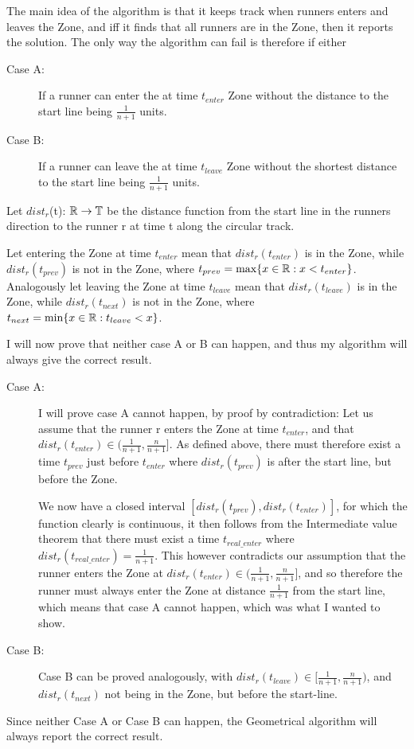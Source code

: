 \begin{theo}[Correctness:]
The main idea of the algorithm is that it keeps track when runners enters and leaves the Zone, and iff it finds that all runners are in the Zone, then it reports the solution. The only way the algorithm can fail is therefore if either

\begin{description}
\item[Case A:] If a runner can enter the at time $t_{enter}$ Zone without the distance to the start line being $\frac{1}{n+1}$ units. 
\item[Case B:] If a runner can leave the at time $t_{leave}$ Zone without the shortest distance to the start line being $\frac{1}{n+1}$ units.  
\end{description}
Let $dist_r$(t): $\mathbb{R} \rightarrow \mathbb{T}$ be the distance function from the start line in the runners direction to the runner r at time t along the circular track.

Let entering the Zone at time $t_{enter}$ mean that $dist_r(t_{enter})$ is in the Zone, while $dist_r(t_{prev})$ is not in the Zone, where $t_{prev} = \max\{x \in \mathbb{R}: x < t_{enter}\}$. Analogously let leaving the Zone at time $t_{leave}$ mean that $dist_r(t_{leave})$ is in the Zone, while $dist_r(t_{next})$ is not in the Zone, where $t_{next} = \min\{x \in \mathbb{R}: t_{leave} < x\}$.
 
I will now prove that neither case A or B can happen, and thus my algorithm will always give the correct result.

\begin{description}
\item[Case A:]I will prove case A cannot happen, by proof by contradiction:
Let us assume that the runner r enters the Zone at time $t_{enter}$, and that $dist_r(t_{enter}) \in (\frac{1}{n+1}, \frac{n}{n+1}]$. As defined above, there must therefore exist a time $t_{prev}$ just before $t_{enter}$ where $dist_r(t_{prev})$ is after the start line, but before the Zone. 

We now have a closed interval $[dist_r(t_{prev}), dist_r(t_{enter})]$, for which the function clearly is continuous, it then follows from the Intermediate value theorem that there must exist a time $t_{real\_enter}$ where $dist_r(t_{real\_enter}) = \frac{1}{n+1}$. This however contradicts our assumption that the runner enters the Zone at $dist_r(t_{enter}) \in (\frac{1}{n+1}, \frac{n}{n+1}]$, and so therefore the runner must always enter the Zone at distance $\frac{1}{n+1}$ from the start line, which means that case A cannot happen, which was what I wanted to show.
\item[Case B:]Case B can be proved analogously, with $dist_r(t_{leave}) \in [\frac{1}{n+1}, \frac{n}{n+1})$, and $dist_r(t_{next})$ not being in the Zone, but before the start-line.
\end{description}
Since neither Case A or Case B can happen, the Geometrical algorithm will always report the correct result.
\end{theo}

